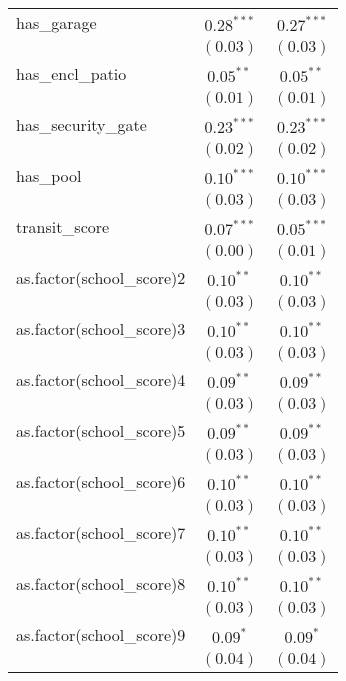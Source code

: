 \begin{center}
\begin{longtable}{l c c}
has\_garage                & $0.28^{***}$  & $0.27^{***}$  \\
                           & $(0.03)$      & $(0.03)$      \\
has\_encl\_patio           & $0.05^{**}$   & $0.05^{**}$   \\
                           & $(0.01)$      & $(0.01)$      \\
has\_security\_gate        & $0.23^{***}$  & $0.23^{***}$  \\
                           & $(0.02)$      & $(0.02)$      \\
has\_pool                  & $0.10^{***}$  & $0.10^{***}$  \\
                           & $(0.03)$      & $(0.03)$      \\
transit\_score             & $0.07^{***}$  & $0.05^{***}$  \\
                           & $(0.00)$      & $(0.01)$      \\
as.factor(school\_score)2  & $0.10^{**}$   & $0.10^{**}$   \\
                           & $(0.03)$      & $(0.03)$      \\
as.factor(school\_score)3  & $0.10^{**}$   & $0.10^{**}$   \\
                           & $(0.03)$      & $(0.03)$      \\
as.factor(school\_score)4  & $0.09^{**}$   & $0.09^{**}$   \\
                           & $(0.03)$      & $(0.03)$      \\
as.factor(school\_score)5  & $0.09^{**}$   & $0.09^{**}$   \\
                           & $(0.03)$      & $(0.03)$      \\
as.factor(school\_score)6  & $0.10^{**}$   & $0.10^{**}$   \\
                           & $(0.03)$      & $(0.03)$      \\
as.factor(school\_score)7  & $0.10^{**}$   & $0.10^{**}$   \\
                           & $(0.03)$      & $(0.03)$      \\
as.factor(school\_score)8  & $0.10^{**}$   & $0.10^{**}$   \\
                           & $(0.03)$      & $(0.03)$      \\
as.factor(school\_score)9  & $0.09^{*}$    & $0.09^{*}$    \\
                           & $(0.04)$      & $(0.04)$      \\

\end{longtable}
\end{center}
